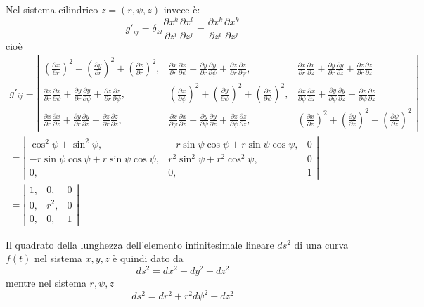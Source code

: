 \documentclass[a4paper,11pt]{article}
\begin{document}
Nel sistema cilindrico $ z= (r, \psi, z) $ invece è:
\[
	g'_{ij} = \delta_{kl} \frac{\partial x^k}{\partial z^i} \frac{\partial x^l}{\partial z^j} = \frac{\partial x^k}{\partial z^i} \frac{\partial x^k}{\partial z^j}
\]
cioè
\begin{eqnarray*}
	g'_{ij} = \left|
\begin{array}{ccc}
	(\frac{\partial x}{\partial r})^2 + (\frac{\partial y}{\partial r})^2 + (\frac{\partial z}{\partial r})^2,
	& \frac{\partial x}{\partial r}\frac{\partial x}{\partial \psi} + \frac{\partial y}{\partial r}\frac{\partial y}{\partial \psi} + \frac{\partial z}{\partial r}\frac{\partial z}{\partial \psi},
	& \frac{\partial x}{\partial r}\frac{\partial x}{\partial z} + \frac{\partial y}{\partial r}\frac{\partial y}{\partial z} + \frac{\partial z}{\partial r}\frac{\partial z}{\partial z}
\\
	\frac{\partial x}{\partial r}\frac{\partial x}{\partial \psi} + \frac{\partial y}{\partial r}\frac{\partial y}{\partial \psi} + \frac{\partial z}{\partial r}\frac{\partial z}{\partial \psi},
	& (\frac{\partial x}{\partial \psi})^2 + (\frac{\partial y}{\partial \psi})^2 + (\frac{\partial z}{\partial \psi})^2,
	& \frac{\partial x}{\partial \psi}\frac{\partial x}{\partial z} + \frac{\partial y}{\partial \psi}\frac{\partial y}{\partial z} + \frac{\partial z}{\partial \psi}\frac{\partial z}{\partial z}
\\
	\frac{\partial x}{\partial r}\frac{\partial x}{\partial z} + \frac{\partial y}{\partial r}\frac{\partial y}{\partial z} + \frac{\partial z}{\partial r}\frac{\partial z}{\partial z},
	& \frac{\partial x}{\partial \psi}\frac{\partial x}{\partial z} + \frac{\partial y}{\partial \psi}\frac{\partial y}{\partial z} + \frac{\partial z}{\partial \psi}\frac{\partial z}{\partial z},
	& (\frac{\partial x}{\partial z})^2 + (\frac{\partial y}{\partial z})^2 + (\frac{\partial \psi}{\partial z})^2
\end{array}
	\right|
\\
	= \left|
\begin{array}{ccc}
	\cos^2 \psi + \sin^2 \psi,
	& -r \sin \psi \cos \psi +r \sin \psi \cos \psi,
	& 0
\\
	-r \sin \psi \cos \psi +r \sin \psi \cos \psi,
	& r^2 \sin^2 \psi + r^2 \cos^2 \psi,
	& 0
\\
	0, & 0, &1
\end{array}
	\right|
\\
	= \left|
\begin{array}{ccc}
	1, & 0, & 0
\\
	0, & r^2, & 0
\\
	0, & 0, & 1
\end{array}
	\right|
\end{eqnarray*}

Il quadrato della lunghezza dell'elemento infinitesimale lineare $ ds^2 $ di una curva $ f(t) $ nel sistema $ x, y, z $ è quindi dato da
\[
	ds^2 = dx^2 + dy^2 + dz^2
\]
mentre nel sistema $ r,  \psi, z $
\[
	ds^2 = dr^2 + r^2 d\psi^2 + dz^2
\]
\end{document}
